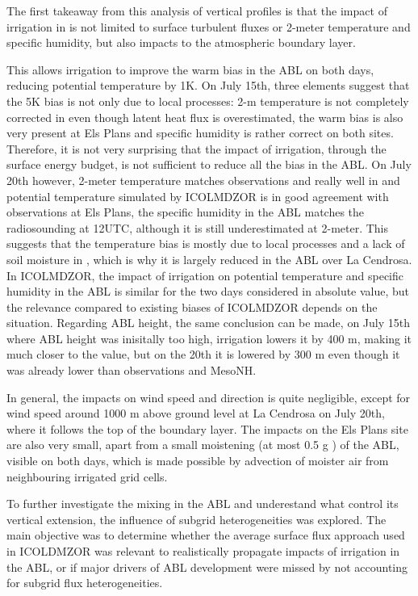 \hfill

The first takeaway from this analysis of vertical profiles is that the impact of irrigation in \irrboost is not limited to surface turbulent fluxes or 2-meter temperature and specific humidity, but also impacts to the atmospheric boundary layer.

This allows irrigation to improve the warm bias in the ABL on both days, reducing potential temperature by 1K. 
On July 15th, three elements suggest that the 5K bias is not only due to local processes: 2-m temperature is not completely corrected in \irrboost even though latent heat flux is overestimated, the warm bias is also very present at Els Plans and specific humidity is rather correct on both sites. Therefore, it is not very surprising that the impact of irrigation, through the surface energy budget, is not sufficient to reduce all the bias in the ABL. 
On July 20th however, 2-meter temperature matches observations and \mesomean really well in \irrboost and potential temperature simulated by ICOLMDZOR is in good agreement with observations at Els Plans, the specific humidity in the ABL matches the radiosounding at 12UTC, although it is still underestimated at 2-meter. This suggests that the temperature bias is mostly due to local processes and a lack of soil moisture in \noirr, which is why it is largely reduced in the ABL over La Cendrosa.
In ICOLMDZOR, the impact of irrigation on potential temperature and specific humidity in the ABL is similar for the two days considered in absolute value, but the relevance compared to existing biases of ICOLMDZOR depends on the situation.
Regarding ABL height, the same conclusion can be made, on July 15th where ABL height was inisitally too high, irrigation lowers it by 400 m, making it much closer to the \mesomean value, but on the 20th it is lowered by 300 m even though it was already lower than observations and MesoNH.

In general, the impacts on wind speed and direction is quite negligible, except for wind speed around 1000 m above ground level at La Cendrosa on July 20th, where it follows the top of the boundary layer.
The impacts on the Els Plans site are also very small, apart from a small moistening (at most 0.5 g \perkg) of the ABL, visible on both days, which is made possible by advection of moister air from neighbouring irrigated grid cells.

To further investigate the mixing in the ABL and underestand what control its vertical extension, the influence of subgrid heterogeneities was explored.
The main objective was to determine whether the average surface flux approach used in ICOLDMZOR was relevant to realistically propagate impacts of irrigation in the ABL, or if major drivers of ABL development were missed by not accounting for subgrid flux heterogeneities. 


